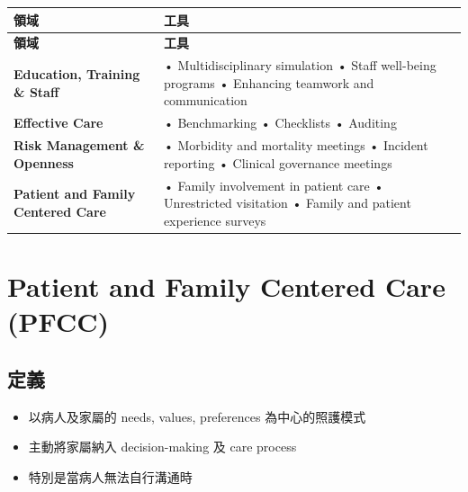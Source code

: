 \documentclass[12pt,a4paper]{article}
\begin{document}
\begin{longtable}{p{4cm}p{10cm}}
\toprule
\textbf{領域} & \textbf{工具} \\
\midrule
\endfirsthead

\toprule
\textbf{領域} & \textbf{工具} \\
\midrule
\endhead

\bottomrule
\endfoot

\textbf{Education, Training \& Staff} &
• Multidisciplinary simulation\newline
• Staff well-being programs\newline
• Enhancing teamwork and communication \\
\midrule
\textbf{Effective Care} &
• Benchmarking\newline
• Checklists\newline
• Auditing \\
\midrule
\textbf{Risk Management \& Openness} &
• Morbidity and mortality meetings\newline
• Incident reporting\newline
• Clinical governance meetings \\
\midrule
\textbf{Patient and Family Centered Care} &
• Family involvement in patient care\newline
• Unrestricted visitation\newline
• Family and patient experience surveys \\
\bottomrule
\end{longtable}

\section{Patient and Family Centered Care (PFCC)}

\subsection{定義}

\begin{itemize}
    \item 以病人及家屬的 needs, values, preferences 為中心的照護模式
    \item 主動將家屬納入 decision-making 及 care process
    \item 特別是當病人無法自行溝通時
\end{itemize}
\end{document}
